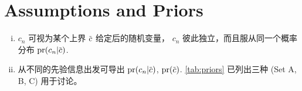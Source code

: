 
\section{Assumptions and Priors}
\begin{enumerate}[i)]
\item $c_n$ 可视为某个上界 $\dmscbar$ 给定后的随机变量，
  $c_n$ 彼此独立，而且服从同一个概率分布 $\dmspr(c_n|\dmscbar)$.
\item 从不同的先验信息出发可导出 $\dmspr(c_n|\dmscbar)$,
  $\dmspr(\dmscbar)$. \autoref{tab:priors} 已列出三种 (Set A, B, C) 用于讨论。
\end{enumerate}
